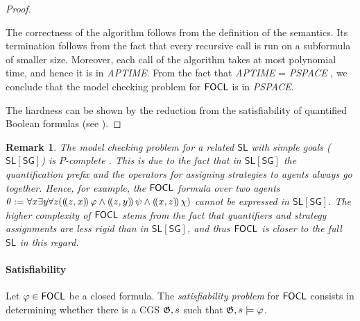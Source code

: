 \documentclass{article}
\newtheorem{remark}{Remark}
\begin{document}
\begin{proof}
\begin{algorithm}
\begin{algorithmic}[1]
        \EndCase
        \EndCase
   \EndProcedure
	\end{algorithmic}
\end{algorithm}
The correctness of the algorithm follows from the definition of the semantics. Its termination follows from the fact that every recursive call is run on a subformula of smaller size. Moreover, each call of the algorithm takes at most polynomial time, and hence it is in \textit{APTIME}. From the fact that \textit{APTIME} = \textit{PSPACE} \cite{alternation}, we conclude that the model checking problem for $\mathsf{FOCL}$ is in \textit{PSPACE}.

    The hardness can be shown by the reduction from the satisfiability of quantified Boolean formulas (see %
    \cite{csl}). %
\end{proof}

\begin{remark}
    The model checking problem for a related \textit{$\mathsf{SL}$ with simple goals} ($\mathsf{SL[SG]}$) is $P$-complete \cite{belardinelli19}. 
This is due to the fact that in $\mathsf{SL[SG]}$ the quantification prefix and the operators for assigning strategies to agents always go together. Hence, for example, the $\mathsf{FOCL}$ formula over two agents $\theta:=\forall x \exists y \forall z ((\!( z,x )\!)\, \varphi \land (\!( z,y )\!)\, \psi \land (\!( x,z )\!)\,\chi)$ cannot be expressed in $\mathsf{SL[SG]}$. The higher complexity of $\mathsf{FOCL}$ stems from the fact that quantifiers and strategy assignments are less rigid than in $\mathsf{SL[SG]}$, and thus $\mathsf{FOCL}$ is closer to the full $\mathsf{SL}$ in this regard. 
\end{remark}

\paragraph*{Satisfiability}
    Let $\varphi \in \mathsf{FOCL}$ be a closed formula. The \emph{satisfiability problem} for $\mathsf{FOCL}$ consists in determining whether there is a CGS $\mathfrak{G},s$ such that $\mathfrak{G},s \models \varphi$. 
\end{document}
